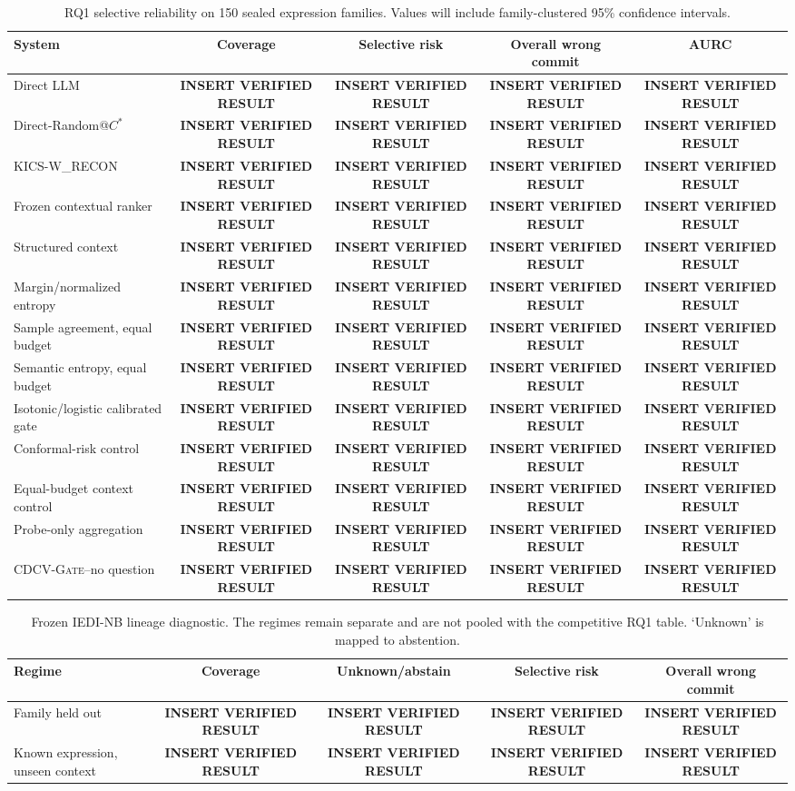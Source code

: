 \documentclass[preprint,12pt,authoryear]{elsarticle}
\newif\ifresultslocked
\newcommand{\cdcv}{\textsc{CDCV-Gate}}
\newcommand{\resultcell}{\ifresultslocked\texttt{RESULTS\_LOCKED}\else
  \textbf{INSERT VERIFIED RESULT}\fi}
\begin{document}
\begin{table}[t]
\centering
\caption{RQ1 selective reliability on 150 sealed expression families. Values
will include family-clustered 95\% confidence intervals.}
\label{tab:rq1}
\small
\begin{tabular}{lcccc}
\toprule
System & Coverage & Selective risk & Overall wrong commit & AURC \\
\midrule
Direct LLM & \resultcell & \resultcell & \resultcell & \resultcell \\
Direct-Random@$C^*$ & \resultcell & \resultcell & \resultcell & \resultcell \\
KICS-W\_RECON & \resultcell & \resultcell & \resultcell & \resultcell \\
Frozen contextual ranker & \resultcell & \resultcell & \resultcell & \resultcell \\
Structured context & \resultcell & \resultcell & \resultcell & \resultcell \\
Margin/normalized entropy & \resultcell & \resultcell & \resultcell & \resultcell \\
Sample agreement, equal budget & \resultcell & \resultcell & \resultcell & \resultcell \\
Semantic entropy, equal budget & \resultcell & \resultcell & \resultcell & \resultcell \\
Isotonic/logistic calibrated gate & \resultcell & \resultcell & \resultcell & \resultcell \\
Conformal-risk control & \resultcell & \resultcell & \resultcell & \resultcell \\
Equal-budget context control & \resultcell & \resultcell & \resultcell & \resultcell \\
Probe-only aggregation & \resultcell & \resultcell & \resultcell & \resultcell \\
\cdcv{}--no question & \resultcell & \resultcell & \resultcell & \resultcell \\
\bottomrule
\end{tabular}
\end{table}

\begin{table}[t]
\centering
\caption{Frozen IEDI-NB lineage diagnostic. The regimes remain separate and
are not pooled with the competitive RQ1 table. `Unknown' is mapped to
abstention.}
\label{tab:iedi}
\small
\begin{tabular}{lcccc}
\toprule
Regime & Coverage & Unknown/abstain & Selective risk & Overall wrong commit \\
\midrule
Family held out & \resultcell & \resultcell & \resultcell & \resultcell \\
Known expression, unseen context & \resultcell & \resultcell & \resultcell & \resultcell \\
\bottomrule
\end{tabular}
\end{table}
\end{document}
